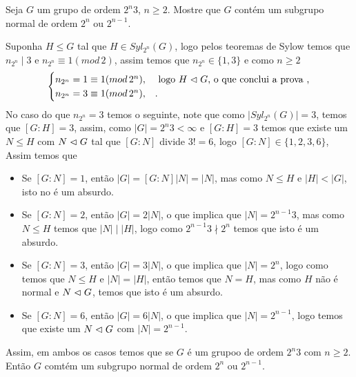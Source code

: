 \begin{homeworkProblem}[12]
  Seja $G$ um grupo de ordem $2^{n}3$, $n\geq 2$. Mostre que $G$ contém um subgrupo normal de ordem $2^{n}$ ou $2^{n-1}$. 
  \begin{solution}
    Suponha $H\leq G$ tal que $H\in Syl_{2^{n}}(G)$, logo pelos teoremas de Sylow temos que $n_{2^{n}}\mid 3$ e $n_{2^{n}}\equiv 1(mod\,2)$, assim temos que $n_{2^{n}}\in\{1,3\}$ e como $n\geq 2$
    \begin{align*}
      \begin{cases}
        n_{2^{n}}=1\equiv 1(mod\,2^{n}), &\text{ logo $H\vartriangleleft G$, o que conclui a prova } \text{,} \\
        n_{2^{n}}=3\equiv 1(mod\,2^{n}), &.
      \end{cases}
    \end{align*}
    No caso do que $n_{2^{n}}=3$ temos o seguinte, note que como $|Syl_{2^{n}}(G)|=3$, temos que $[G:H]=3$, assim, como $|G|=2^{n}3<\infty$ e $[G:H]=3$ temos que existe um $N\leq H$ com $N\vartriangleleft G$ tal que $[G:N]$ divide $3! =6$, logo $[G:N]\in\{1,2,3,6\}$, Assim temos que
    \begin{itemize}
      \item Se $[G:N]=1$, então $|G|=[G:N]|N|=|N|$, mas como $N\leq H$ e $|H|<|G|$, isto no é um absurdo.
      \item Se $[G:N]=2$, então $|G|=2|N|$, o que implica que $|N|=2^{n-1}3$, mas como $N\leq H$ temos que $|N|\mid |H|$, logo como $2^{n-1}3\nmid 2^{n}$ temos que isto é um absurdo.
      \item Se $[G:N]=3$, então $|G|=3|N|$, o que implica que $|N|=2^{n}$, logo como temos que $N\leq H$ e $|N|=|H|$, então temos que $N=H$, mas como $H$ não é normal e $N\vartriangleleft G$, temos que isto é um absurdo.
      \item Se $[G:N]=6$, então $|G|=6|N|$, o que implica que $|N|=2^{n-1}$, logo temos que existe um $N\vartriangleleft G$ com $|N|=2^{n-1}$. 
    \end{itemize}
    Assim, em ambos os casos temos que se $G$ é um grupoo de ordem $2^{n}3$ com $n\geq 2$. Então $G$ comtém um subgrupo normal de ordem $2^{n}$ ou $2^{n-1}$. 
  \end{solution}
\end{homeworkProblem}
